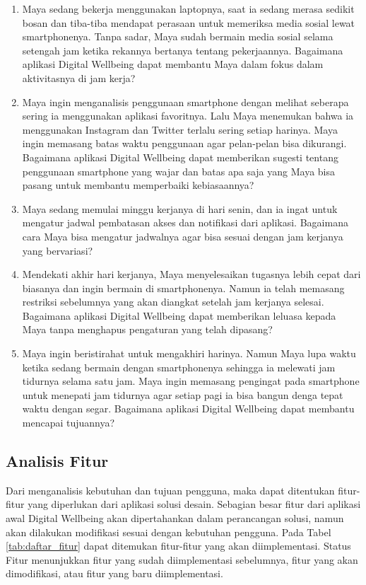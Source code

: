 \begin{enumerate}
  \item Maya sedang bekerja menggunakan laptopnya, saat ia sedang merasa sedikit bosan dan tiba-tiba mendapat perasaan untuk memeriksa media sosial lewat smartphonenya. Tanpa sadar, Maya sudah bermain media sosial selama setengah jam ketika rekannya bertanya tentang pekerjaannya. Bagaimana aplikasi Digital Wellbeing dapat membantu Maya dalam fokus dalam aktivitasnya di jam kerja?
  \item Maya ingin menganalisis penggunaan smartphone dengan melihat seberapa sering ia menggunakan aplikasi favoritnya. Lalu Maya menemukan bahwa ia menggunakan Instagram dan Twitter terlalu sering setiap harinya. Maya ingin memasang batas waktu penggunaan agar pelan-pelan bisa dikurangi. Bagaimana aplikasi Digital Wellbeing dapat memberikan sugesti  tentang penggunaan smartphone yang wajar dan batas apa saja yang Maya bisa pasang untuk membantu memperbaiki kebiasaannya?
  \item Maya sedang memulai minggu kerjanya di hari senin, dan ia ingat untuk mengatur jadwal pembatasan akses dan notifikasi dari aplikasi. Bagaimana cara Maya bisa mengatur jadwalnya agar bisa sesuai dengan jam kerjanya yang bervariasi?
  \item Mendekati akhir hari kerjanya, Maya menyelesaikan tugasnya lebih cepat dari biasanya dan ingin bermain di smartphonenya. Namun ia telah memasang restriksi sebelumnya yang akan diangkat setelah jam kerjanya selesai. Bagaimana aplikasi Digital Wellbeing dapat memberikan leluasa kepada Maya tanpa menghapus pengaturan yang telah dipasang?
  \item Maya ingin beristirahat untuk mengakhiri harinya. Namun Maya lupa waktu ketika sedang bermain dengan smartphonenya sehingga ia melewati jam tidurnya selama satu jam. Maya ingin memasang pengingat pada smartphone untuk menepati jam tidurnya agar setiap pagi ia bisa bangun denga tepat waktu dengan segar. Bagaimana aplikasi Digital Wellbeing dapat membantu mencapai tujuannya?
\end{enumerate}

\subsection{Analisis Fitur}

Dari menganalisis kebutuhan dan tujuan pengguna, maka dapat ditentukan fitur-fitur yang diperlukan dari aplikasi solusi desain. Sebagian besar fitur dari aplikasi awal Digital Wellbeing akan dipertahankan dalam perancangan solusi, namun akan dilakukan modifikasi sesuai dengan kebutuhan pengguna. Pada Tabel \ref{tab:daftar_fitur} dapat ditemukan fitur-fitur yang akan diimplementasi. Status Fitur menunjukkan fitur yang sudah diimplementasi sebelumnya, fitur yang akan dimodifikasi, atau fitur yang baru diimplementasi.

